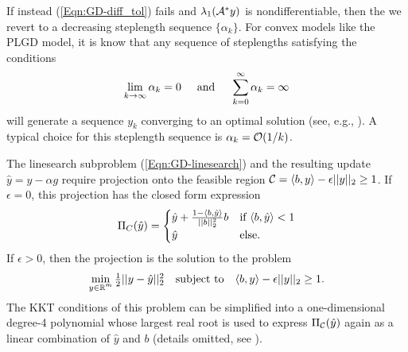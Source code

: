 If instead (\ref{Eqn:GD-diff_tol}) fails and $\lambda_1({\mathcal A}^* y)$ is nondifferentiable, then the we revert to a decreasing steplength sequence $\{ \alpha_k \}$.  For convex models like the PLGD model, it is know that any sequence of steplengths satisfying the conditions
\begin{equation} 		\label{Eqn:GD-steplength_sum}
	\lim\limits_{\substack{k \rightarrow \infty}} \alpha_k = 0
	\hspace{.5cm} \textnormal{and} \hspace{.5cm}
	\sum\limits_{\substack{k = 0}}^{\substack{\infty}} \alpha_k = \infty
\end{equation}
will generate a sequence $y_k$ converging to an optimal solution (see, e.g., \cite[Proposition 1.2.3 and Section 3.3.1]{bertsekas2016nonlinear}).  A typical choice for this steplength sequence is $\alpha_k = {\mathcal O}(1/k)$.





The linesearch subproblem (\ref{Eqn:GD-linesearch}) and the resulting update $\hat{y} = y - \alpha g$ require projection onto the feasible region ${\mathcal C}= \langle b, y \rangle - \epsilon ||y||_2 \geq 1$.   If $\epsilon = 0$, this projection has the closed form expression
\begin{equation} 	\label{Eqn:GD-projection}
\Pi_C(\hat{y}) =
	\begin{cases}
		\hat{y} + \frac{1 - \langle b, \hat{y} \rangle}{||b||_2^2}b 	&	\textnormal{if} \ \langle b, \hat{y} \rangle < 1		\\
		\hat{y}													& \textnormal{else}.
	\end{cases}
\end{equation}
If $\epsilon > 0$, then the projection is the solution to the problem
\begin{equation}		\label{Eqn:GD-projection_2}
\begin{array}{lcr}
\min\limits_{\substack{ y \in \mathbb{R}^m}} \frac{1}{2} || y - \hat{y} ||_2^2
	&	\textnormal{subject to} 	&	 \langle b, y \rangle - \epsilon ||y||_2 \geq 1.
\end{array}
\end{equation}
The KKT conditions of this problem can be simplified into a one-dimensional degree-4 polynomial whose largest real root is used to express $\Pi_{\mathcal C}(\hat{y})$ again as a linear combination of $\hat{y}$ and $b$ (details omitted, see \cite[Chapter 5]{boyd2004convex}).







